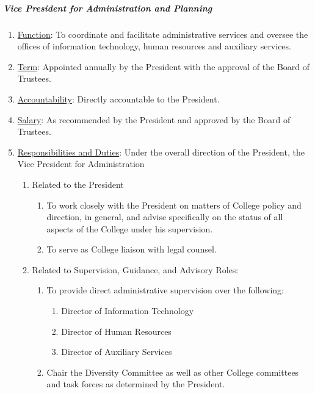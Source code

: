 \documentclass[letterpaper, 11pt]{article}
\newcommand{\note}[2]{\setlength{\fboxrule}{#2}\fbox{\parbox{\columnwidth}{#1}}}
\newcommand{\donNote}[1]{\note{#1 \hfill {\bfseries djp3}}{0.9mm}}
\begin{document}
				\subparagraph{Vice President for Administration and Planning}
					\begin{enumerate}
						\item{\underline{Function}:  To coordinate and facilitate administrative services and oversee the offices of information technology, human resources and auxiliary services.}
						\item{\underline{Term}:  Appointed annually by the President with the approval of the Board of Trustees.}
						\item{\underline{Accountability}:  Directly accountable to the President.}
						\item{\underline{Salary}:  As recommended by the President and approved by the Board of Trustees.}
						\item{\underline{Responsibilities and Duties}:  Under the overall direction of the President, the Vice President for Administration
							\begin{enumerate}
								\item{Related to the President
									\begin{enumerate}
										\item{ \donNote{his or her} To work closely with the President on matters of College policy and direction, in general, and advise specifically on the status of all aspects of the College under his supervision.}
										\item{To serve as College liaison with legal counsel.}
									\end{enumerate}
								}
								\item{Related to Supervision, Guidance, and Advisory Roles:
									\begin{enumerate}
										\item{To provide direct administrative supervision over the following:
											\begin{enumerate}
												\item{Director of Information Technology}
												\item{Director of Human Resources}
												\item{Director of Auxiliary Services}
											\end{enumerate}
										}
										\item{Chair the Diversity Committee as well as other College committees and task forces as determined by the President.}
									\end{enumerate}
								}
							\end{enumerate}
						}
					\end{enumerate}
\end{document}
